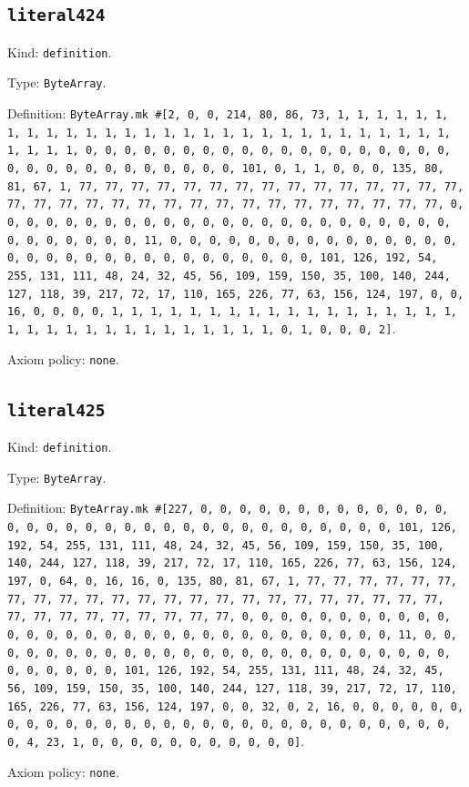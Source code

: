\documentclass[11pt]{article}
\begin{document}
\subsection*{\texttt{literal424}}
\noindent Kind: \texttt{definition}.\par
\noindent Type: \texttt{ByteArray}.\par
\noindent Definition: \texttt{ByteArray.mk \#[2, 0, 0, 214, 80, 86, 73, 1, 1, 1, 1, 1, 1, 1, 1, 1, 1, 1, 1, 1, 1, 1, 1, 1, 1, 1, 1, 1, 1, 1, 1, 1, 1, 1, 1, 1, 1, 1, 1, 1, 0, 0, 0, 0, 0, 0, 0, 0, 0, 0, 0, 0, 0, 0, 0, 0, 0, 0, 0, 0, 0, 0, 0, 0, 0, 0, 0, 0, 0, 0, 0, 101, 0, 1, 1, 0, 0, 0, 135, 80, 81, 67, 1, 77, 77, 77, 77, 77, 77, 77, 77, 77, 77, 77, 77, 77, 77, 77, 77, 77, 77, 77, 77, 77, 77, 77, 77, 77, 77, 77, 77, 77, 77, 77, 77, 0, 0, 0, 0, 0, 0, 0, 0, 0, 0, 0, 0, 0, 0, 0, 0, 0, 0, 0, 0, 0, 0, 0, 0, 0, 0, 0, 0, 0, 0, 0, 11, 0, 0, 0, 0, 0, 0, 0, 0, 0, 0, 0, 0, 0, 0, 0, 0, 0, 0, 0, 0, 0, 0, 0, 0, 0, 0, 0, 0, 0, 0, 0, 101, 126, 192, 54, 255, 131, 111, 48, 24, 32, 45, 56, 109, 159, 150, 35, 100, 140, 244, 127, 118, 39, 217, 72, 17, 110, 165, 226, 77, 63, 156, 124, 197, 0, 0, 16, 0, 0, 0, 0, 1, 1, 1, 1, 1, 1, 1, 1, 1, 1, 1, 1, 1, 1, 1, 1, 1, 1, 1, 1, 1, 1, 1, 1, 1, 1, 1, 1, 1, 1, 1, 1, 0, 1, 0, 0, 0, 2]}.\par
\noindent Axiom policy: \texttt{none}.\par
\subsection*{\texttt{literal425}}
\noindent Kind: \texttt{definition}.\par
\noindent Type: \texttt{ByteArray}.\par
\noindent Definition: \texttt{ByteArray.mk \#[227, 0, 0, 0, 0, 0, 0, 0, 0, 0, 0, 0, 0, 0, 0, 0, 0, 0, 0, 0, 0, 0, 0, 0, 0, 0, 0, 0, 0, 0, 0, 0, 0, 0, 101, 126, 192, 54, 255, 131, 111, 48, 24, 32, 45, 56, 109, 159, 150, 35, 100, 140, 244, 127, 118, 39, 217, 72, 17, 110, 165, 226, 77, 63, 156, 124, 197, 0, 64, 0, 16, 16, 0, 135, 80, 81, 67, 1, 77, 77, 77, 77, 77, 77, 77, 77, 77, 77, 77, 77, 77, 77, 77, 77, 77, 77, 77, 77, 77, 77, 77, 77, 77, 77, 77, 77, 77, 77, 77, 77, 0, 0, 0, 0, 0, 0, 0, 0, 0, 0, 0, 0, 0, 0, 0, 0, 0, 0, 0, 0, 0, 0, 0, 0, 0, 0, 0, 0, 0, 0, 0, 11, 0, 0, 0, 0, 0, 0, 0, 0, 0, 0, 0, 0, 0, 0, 0, 0, 0, 0, 0, 0, 0, 0, 0, 0, 0, 0, 0, 0, 0, 0, 0, 101, 126, 192, 54, 255, 131, 111, 48, 24, 32, 45, 56, 109, 159, 150, 35, 100, 140, 244, 127, 118, 39, 217, 72, 17, 110, 165, 226, 77, 63, 156, 124, 197, 0, 0, 32, 0, 2, 16, 0, 0, 0, 0, 0, 0, 0, 0, 0, 0, 0, 0, 0, 0, 0, 0, 0, 0, 0, 0, 0, 0, 0, 0, 0, 0, 0, 0, 0, 0, 4, 23, 1, 0, 0, 0, 0, 0, 0, 0, 0, 0, 0, 0]}.\par
\noindent Axiom policy: \texttt{none}.\par
\end{document}
